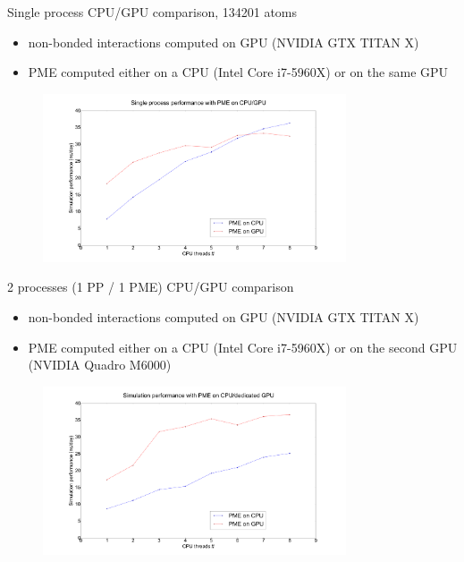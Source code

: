 \documentclass[11pt]{beamer}
\begin{document}
\begin{frame}{Single process CPU/GPU comparison, 134201 atoms}
\begin{itemize}
\item non-bonded interactions computed on GPU (NVIDIA GTX TITAN X)
\item PME computed either on a CPU (Intel Core i7-5960X) or on the same GPU
\end{itemize}
\FloatBarrier
\begin{figure} [h!]
    \centering
    \includegraphics[width=0.8\textwidth]{pics/CPU_GPU_ADH_SINGLE.png}
\end{figure}
\FloatBarrier
\end{frame}

\begin{frame}{2 processes (1 PP / 1 PME) CPU/GPU comparison}
\begin{itemize}
\item non-bonded interactions computed on GPU (NVIDIA GTX TITAN X)
\item PME computed either on a CPU (Intel Core i7-5960X) or on the second GPU (NVIDIA Quadro M6000)
\end{itemize}
\FloatBarrier
\begin{figure} [h!]
    \centering
    \includegraphics[width=0.8\textwidth]{pics/CPU_GPU_ADH.png}
    \label{fig:sepGPUNEW}
\end{figure}
\FloatBarrier
\end{frame}
\end{document}
